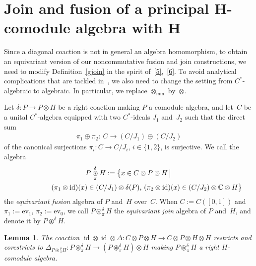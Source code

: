 \documentclass[pdftex]{sigma}
\numberwithin{equation}{section}
\newtheorem{Lemma}[Theorem]{Lemma}
{ \theoremstyle{definition}
\newtheorem{Definition}[Theorem]{Definition}
\newtheorem{Example}[Theorem]{Example}}
\begin{document}
\section[Join and fusion of a principal $H$-comodule algebra with $H$]{Join and fusion of a principal $\boldsymbol{H}$-comodule algebra with $\boldsymbol{H}$}

Since a diagonal coaction is not in general an algebra homomorphism,
to obtain an equivariant version of our noncommutative fusion and join constructions,
we need to modify  Def\/inition~\ref{gjoin}
in the spirit of~\eqref{5},~\eqref{6}.
To avoid analytical complications that
are tackled in~\cite{ddhw}, we also need to change the setting from $C^*$-algebraic to algebraic. In particular,
we replace $\otimes_{\min}$ by~$\otimes$.

\begin{Definition}\label{pjoin}
Let $\delta\colon P\to P\otimes H$ be a right coaction making $P$ a comodule algebra, and
let~$C$ be a unital $C^*$-algebra equipped with two $C^*$-ideals $J_1$ and~$ J_2$
such that the direct sum
\begin{gather*}
\pi_1\oplus\pi_2\colon \ C\longrightarrow (C/J_1) \oplus (C/J_2)
\end{gather*}
of the canonical surjections $\pi_i\colon C\to C/J_i$, $i\in \{1,2\}$, is surjective. We call the algebra
\begin{gather*}
P \underset{\pi}{\overset{\delta}{\circledast}} H :=
\big\{x\in C \otimes P \otimes H \,
\big|\, \\
\hphantom{P \underset{\pi}{\overset{\delta}{\circledast}} H :=\big\{}{}
(\pi_1\otimes \operatorname{id})(x) \in (C/J_1)\otimes \delta (P) ,\,
(\pi_2\otimes \operatorname{id})(x) \in (C/J_2) \otimes \mathbb{C} \otimes H\big\}
\end{gather*}
the \emph{equivariant fusion} algebra of $P$ and~$H$ over~$C$.
When $C:=C([0,1])$  and
$\pi_1:=\mathrm{ev}_1$, $\pi_2:=\mathrm{ev}_0$,
we call $P \circledast^\delta_\pi H$ the \emph{equivariant join} algebra of $P$ and~$H$,
and denote it by $P \circledast^\delta H$.
\end{Definition}

\begin{Lemma}
The coaction $\operatorname{id}\otimes\operatorname{id}\otimes\Delta\colon
C\otimes P\otimes H\to C\otimes P\otimes H\otimes H$
restricts and corestricts to $\Delta_{P\circledast{}^\delta_\pi H}\colon P{\circledast}^\delta_\pi   H
\to (P{\circledast}^\delta_\pi H)\otimes H$ making $P{\circledast}^\delta_\pi H$
a right $H$-comodule algebra.
\end{Lemma}
\end{document}
